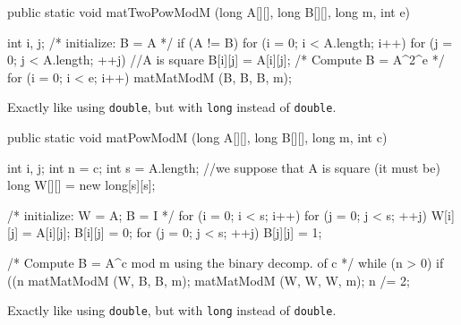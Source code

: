 \begin{code}

   public static void matTwoPowModM (long A[][], long B[][], long m, int e) \begin{hide} {
      int i, j;
      /* initialize: B = A */
      if (A != B) {
         for (i = 0; i < A.length; i++) {
            for (j = 0; j < A.length;  ++j)  //A is square
               B[i][j] = A[i][j];
         }
      }
      /* Compute B = A^{2^e} */
      for (i = 0; i < e; i++)
         matMatModM (B, B, B, m);
   } \end{hide}
\end{code}
\begin{tabb} Exactly like  using \texttt{double}, but with \texttt{long} instead of 
  \texttt{double}.
\end{tabb}
\begin{htmlonly}
\end{htmlonly}
\begin{code}

   public static void matPowModM (long A[][], long B[][], long m, int c) \begin{hide} {
      int i, j;
      int n = c;
      int s = A.length;   //we suppose that A is square (it must be)
      long W[][] = new long[s][s];

      /* initialize: W = A; B = I */
      for (i = 0; i < s; i++) {
         for (j = 0; j < s;  ++j)  {
            W[i][j] = A[i][j];
            B[i][j] = 0;
         }
      }
      for (j = 0; j < s;  ++j)
         B[j][j] = 1;

      /* Compute B = A^c mod m using the binary decomp. of c */
      while (n > 0) {
         if ((n %
            matMatModM (W, B, B, m);
         matMatModM (W, W, W, m);
         n /= 2;
      }
   } \end{hide}
\end{code}
\begin{tabb} Exactly like  using \texttt{double}, but with \texttt{long} instead
  of \texttt{double}.
\end{tabb}
\begin{htmlonly}
\end{htmlonly}
\begin{code}
\begin{hide}
}
\end{hide}
\end{code}


